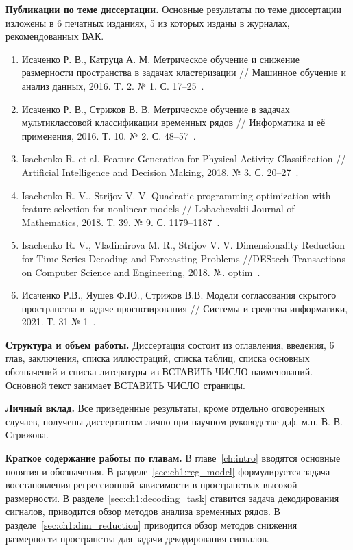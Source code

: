 \vspace{0.5cm}
\textbf{Публикации по теме диссертации.}
Основные результаты по теме диссертации изложены в 6 печатных изданиях, 5 из которых изданы в журналах, рекомендованных ВАК.

\begin{enumerate}
	\item Исаченко Р. В., Катруца А. М. Метрическое обучение и снижение размерности пространства в задачах кластеризации // Машинное обучение и анализ данных, 2016. T. 2. № 1. С. 17--25~\cite{isachenko2016metricjmlda}.
	\item Исаченко Р. В., Стрижов В. В. Метрическое обучение в задачах мультиклассовой классификации временных рядов // Информатика и её применения, 2016. Т. 10. № 2. С. 48--57~\cite{isachenko2016metricia}.
	\item Isachenko R. et al. Feature Generation for Physical Activity Classification // Artificial Intelligence and Decision Making, 2018. № 3. С. 20--27~\cite{isachenko2018feature}.
	\item Isachenko R. V., Strijov V. V. Quadratic programming optimization with feature selection for nonlinear models // Lobachevskii Journal of Mathematics, 2018. Т. 39. № 9. С. 1179--1187~\cite{isachenko2018quadratic}.
	\item Isachenko R. V., Vladimirova M. R., Strijov V. V. Dimensionality Reduction for Time Series Decoding and Forecasting Problems //DEStech Transactions on Computer Science and Engineering, 2018. №. optim~\cite{isachenko2018plsdestech}.
	\item Исаченко Р.В., Яушев Ф.Ю., Стрижов В.В. Модели согласования скрытого пространства в задаче прогнозирования // Системы и средства информатики, 2021. Т. 31 № 1~\cite{isachenko2021concordance}.
\end{enumerate}

\vspace{0.5cm}
\textbf{Структура и объем работы.}
Диссертация состоит из оглавления, введения, 6 глав, заключения, списка иллюстраций, списка таблиц, списка основных обозначений и списка литературы из {\color{red} ВСТАВИТЬ ЧИСЛО} наименований. 
Основной текст занимает {\color{red} ВСТАВИТЬ ЧИСЛО} страницы.

\vspace{0.5cm}
\textbf{Личный вклад.}
Все приведенные результаты, кроме отдельно оговоренных случаев, получены диссертантом лично при научном руководстве д.ф.-м.н. В. В. Стрижова.

\vspace{0.5cm}
\textbf{Краткое содержание работы по главам.}
В главе~\ref{ch:intro} вводятся основные понятия и обозначения. 
В разделе~\ref{sec:ch1:reg_model} формулируется задача восстановления регрессионной зависимости в пространствах высокой размерности.
В разделе~\ref{sec:ch1:decoding_task} ставится задача декодирования сигналов, приводится обзор методов анализа временных рядов.
В разделе~\ref{sec:ch1:dim_reduction} приводится обзор методов снижения размерности пространства для задачи декодирования сигналов.

